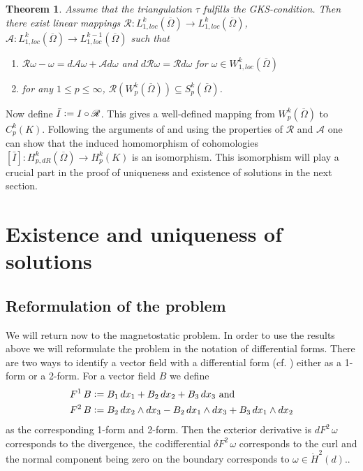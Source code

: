 \documentclass[12pt,a4paper]{article}
\newtheorem{theorem}{Theorem}
\theoremstyle{definition}
\newcommand{\aop}{\mathscr{A}}
\newcommand{\omegabar}{\overline{\Omega}}
\newcommand{\rop}{\mathscr{R}} %
\begin{document}
\begin{theorem}\label{operators}
    Assume that the triangulation $\tau$ fulfills the GKS-condition.
    Then there exist linear mappings 
    $\mathscr{R}: L^k_{1,loc}(\omegabar) \rightarrow 
    L^k_{1,loc}(\omegabar)$, $\mathscr{A}: L^k_{1,loc}(\omegabar) 
    \rightarrow L^{k-1}_{1,loc}(\omegabar)$ 
    such that
    \begin{enumerate}
        \item $\mathscr{R}\omega - \omega = 
            d\mathscr{A}\omega + \mathscr{A}d\omega$ and 
            $d\rop \omega  = \rop d \omega$ for 
            $\omega \in W^k_{1,loc}(\omegabar)$
        \item for any $1 \leq p \leq \infty$, 
            $\rop(W^k_p(\omegabar)) \subseteq S^k_p(\omegabar)$.
    \end{enumerate}
\end{theorem}
Now define $\bar{I} \vcentcolon= I \circ \rop$. This gives a well-defined 
mapping from $W^k_p(\omegabar)$ to $C^k_p(K)$. Following the arguments of 
\cite{goldshtein} and using the properties of $\rop$ and $\aop$ one can show 
that the induced homomorphism of cohomologies 
$[\bar{I}]: H^k_{p,dR}(\omegabar) \rightarrow H^k_p(K)$ is an isomorphism.
This isomorphism will play a crucial part in the proof of uniqueness and 
existence of solutions in the next section.


\section{Existence and uniqueness of solutions}

\subsection{Reformulation of the problem} 

We will return now to the magnetostatic problem. In order to use the results
above we will reformulate the problem in the notation of differential forms.
There are two ways to identify a vector field with a differential form 
(cf. \cite[Table 6.1 and p.70]{arnold}) either as a 1-form or a 2-form. 
For a vector field $B$ we define
\begin{align*}
    F^1\, B &\vcentcolon= B_1 \, dx_1 + B_2 \, dx_2 + B_3\, dx_3 \text{ and}\\
    F^2\, B &\vcentcolon= B_2 \, dx_2 \wedge dx_3 - B_2 \, dx_1 \wedge dx_3
        + B_3 \, dx_1 \wedge dx_2
\end{align*} 
as the corresponding 1-form and 2-form. 
Then the exterior derivative is $dF^2\,\omega$ corresponds to the divergence,
the codifferential $\delta F^2\,\omega$ 
corresponds to the curl and the normal component
being zero on the boundary corresponds 
to $\omega \in \mathring{H}^2(d)$.\cite{}. 
\end{document}

